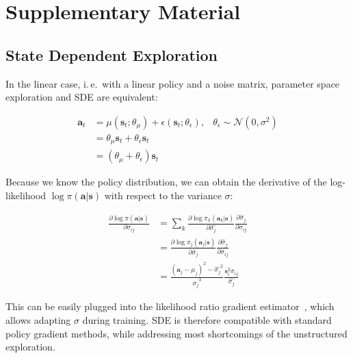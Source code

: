 \documentclass{article}
\newcommand{\ie}{i.\,e.\ }
\newcommand{\state}{\mathbf{s}}
\newcommand{\action}{\mathbf{a}}
\newcommand{\at}{{\action_t}}
\newcommand{\st}{{\state_t}}
\newcommand{\policy}{\pi}
\newcommand{\normal}{\mathcal{N}}
\newcommand{\noise}{\epsilon}
\newcommand{\SDE}{\textsc{SDE}\xspace}
\begin{document}
  

\clearpage











\appendix

\section{Supplementary Material}

\subsection{State Dependent Exploration}
\label{sec:sde-eq}


In the linear case, \ie with a linear policy and a noise matrix, parameter space exploration and \SDE are equivalent:

\begin{align*}
  \at &= \mu(\st; \theta_\mu) + \noise(\st; \theta_\noise), & \theta_\noise \sim \normal(0, \sigma^2) \\
      &= \theta_\mu \st + \theta_\noise \st \\
      &= (\theta_\mu + \theta_\noise) \st
\end{align*}

Because we know the policy distribution, we can obtain the derivative of the log-likelihood $\log \policy(\action|\state)$ with respect to the variance $\sigma$:

\begin{align}
  \label{eq:sde-logprob}
  \frac{\partial \log \policy(\action|\state)}{\partial \sigma_{ij}}
  &= \sum_k{\frac{\partial \log \policy_k(\action_k|\state)}{\partial \hat{\sigma_{j}}}
  \frac{\partial \hat{\sigma}_{j}}{\partial \sigma_{ij}}} \\
  &= \frac{\partial \log \policy_j(\action_j|\state)}{\partial \hat{\sigma}_{j}}
  \frac{\partial \hat{\sigma}_{j}}{\partial \sigma_{ij}} \\
  &= \frac{(\action_j - \mu_j)^2 - \hat{\sigma_j}^2}{\hat{\sigma_j}^3}
  \frac{\state_i^2 \sigma_{ij}}{\hat{\sigma_{j}}}
\end{align}


This can be easily plugged into the likelihood ratio gradient estimator~\citep{williams1992simple}, which allows adapting $\sigma$ during training.
\SDE is therefore compatible with standard policy gradient methods, while addressing most shortcomings of the unstructured exploration.
\end{document}
